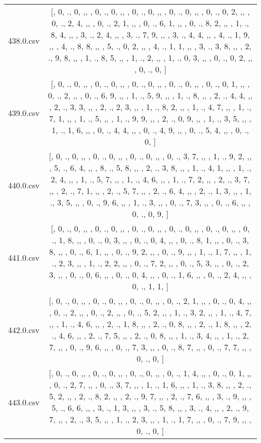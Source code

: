\begin{table}[ht]
\begin{tabular}{@{}c c@{}}
	438.0.csv & [, 0, ., 0, ,,  , 0, ., 0, ,,  , 0, ., 0, ,,  , 0, ., 0, ,,  , 0, ., 0, 2, ,,  , 0, ., 2, 4, ,,  , 0, ., 2, 1, ,,  , 0, ., 6, 1, ,,  , 0, ., 8, 2, ,,  , 1, ., 8, 4, ,,  , 3, ., 2, 4, ,,  , 3, ., 7, 9, ,,  , 3, ., 4, 4, ,,  , 4, ., 1, 9, ,,  , 4, ., 8, 8, ,,  , 5, ., 0, 2, ,,  , 4, ., 1, 1, ,,  , 3, ., 3, 8, ,,  , 2, ., 9, 8, ,,  , 1, ., 8, 5, ,,  , 1, ., 2, ,,  , 1, ., 0, 3, ,,  , 0, ., 0, 2, ,,  , 0, ., 0, ]\\ 
	439.0.csv & [, 0, ., 0, ,,  , 0, ., 0, ,,  , 0, ., 0, ,,  , 0, ., 0, ,,  , 0, ., 0, 1, ,,  , 0, ., 2, ,,  , 0, ., 6, 9, ,,  , 1, ., 5, 9, ,,  , 1, ., 8, ,,  , 2, ., 4, 4, ,,  , 2, ., 3, 3, ,,  , 2, ., 2, 3, ,,  , 1, ., 8, 2, ,,  , 1, ., 4, 7, ,,  , 1, ., 7, 1, ,,  , 1, ., 5, ,,  , 1, ., 9, 9, ,,  , 2, ., 0, 9, ,,  , 1, ., 3, 5, ,,  , 1, ., 1, 6, ,,  , 0, ., 4, 4, ,,  , 0, ., 4, 9, ,,  , 0, ., 5, 4, ,,  , 0, ., 0, ]\\ 
	440.0.csv & [, 0, ., 0, ,,  , 0, ., 0, ,,  , 0, ., 0, ,,  , 0, ., 3, 7, ,,  , 1, ., 9, 2, ,,  , 5, ., 6, 4, ,,  , 8, ., 5, 8, ,,  , 2, ., 3, 8, ,,  , 1, ., 4, 1, ,,  , 1, ., 2, 4, ,,  , 1, ., 5, 7, ,,  , 1, ., 4, 6, ,,  , 1, ., 7, 2, ,,  , 2, ., 3, 7, ,,  , 2, ., 7, 1, ,,  , 2, ., 5, 7, ,,  , 2, ., 6, 4, ,,  , 2, ., 1, 3, ,,  , 1, ., 3, 5, ,,  , 0, ., 9, 6, ,,  , 1, ., 3, ,,  , 0, ., 7, 3, ,,  , 0, ., 6, ,,  , 0, ., 0, 9, ]\\ 
	441.0.csv & [, 0, ., 0, ,,  , 0, ., 0, ,,  , 0, ., 0, ,,  , 0, ., 0, ,,  , 0, ., 0, ,,  , 0, ., 1, 8, ,,  , 0, ., 0, 3, ,,  , 0, ., 0, 4, ,,  , 0, ., 8, 1, ,,  , 0, ., 3, 8, ,,  , 0, ., 6, 1, ,,  , 0, ., 9, 2, ,,  , 0, ., 9, ,,  , 1, ., 1, 7, ,,  , 1, ., 2, 3, ,,  , 1, ., 2, 2, ,,  , 0, ., 7, 2, ,,  , 0, ., 5, 3, ,,  , 0, ., 2, 3, ,,  , 0, ., 0, 6, ,,  , 0, ., 0, 4, ,,  , 0, ., 1, 6, ,,  , 0, ., 2, 4, ,,  , 0, ., 1, 1, ]\\ 
	442.0.csv & [, 0, ., 0, ,,  , 0, ., 0, ,,  , 0, ., 0, ,,  , 0, ., 2, 1, ,,  , 0, ., 0, 4, ,,  , 0, ., 2, ,,  , 0, ., 2, ,,  , 0, ., 5, 2, ,,  , 1, ., 3, 2, ,,  , 1, ., 4, 7, ,,  , 1, ., 4, 6, ,,  , 2, ., 1, 8, ,,  , 2, ., 0, 8, ,,  , 2, ., 1, 8, ,,  , 2, ., 4, 6, ,,  , 2, ., 7, 5, ,,  , 2, ., 0, 8, ,,  , 1, ., 3, 4, ,,  , 1, ., 2, 7, ,,  , 0, ., 9, 6, ,,  , 0, ., 7, 3, ,,  , 0, ., 8, 7, ,,  , 0, ., 7, 7, ,,  , 0, ., 0, ]\\ 
	443.0.csv & [, 0, ., 0, ,,  , 0, ., 0, ,,  , 0, ., 0, ,,  , 0, ., 1, 4, ,,  , 0, ., 0, 1, ,,  , 0, ., 2, 7, ,,  , 0, ., 3, 7, ,,  , 1, ., 1, 6, ,,  , 1, ., 3, 8, ,,  , 2, ., 5, 2, ,,  , 2, ., 8, 2, ,,  , 2, ., 9, 7, ,,  , 2, ., 7, 6, ,,  , 3, ., 9, ,,  , 5, ., 6, 6, ,,  , 3, ., 1, 3, ,,  , 3, ., 5, 8, ,,  , 3, ., 4, ,,  , 2, ., 9, 7, ,,  , 2, ., 3, 5, ,,  , 1, ., 2, 3, ,,  , 1, ., 1, 7, ,,  , 0, ., 7, 9, ,,  , 0, ., 0, ]\\ 

\end{tabular}
\end{table}
